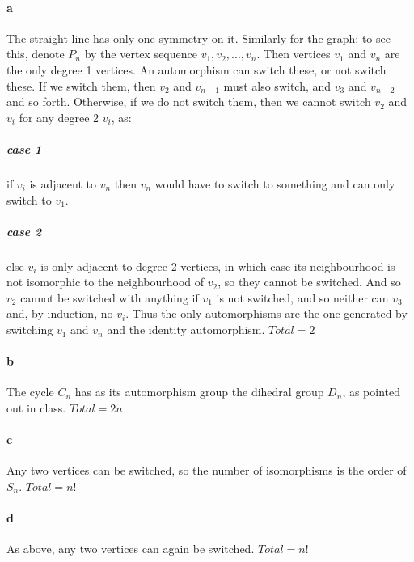 \paragraph{a} The straight line has only one symmetry on it. Similarly for the graph: to see this, denote $P_n$ by the vertex sequence $v_1,v_2,...,v_n$. Then vertices $v_1$ and $v_n$ are the only degree 1 vertices. An automorphism can switch these, or not switch these. If we switch them, then $v_2$ and $v_{n-1}$ must also switch, and $v_3$ and $v_{n-2}$ and so forth. Otherwise, if we do not switch them, then we cannot switch $v_2$ and $v_i$ for any degree 2 $v_i$, as:
\subparagraph{case 1} if $v_i$ is adjacent to $v_n$ then $v_n$ would have to switch to something and can only switch to $v_1$.
\subparagraph{case 2} else $v_i$ is only adjacent to degree 2 vertices, in which case its neighbourhood is not isomorphic to the neighbourhood of $v_2$, so they cannot be switched.
And so $v_2$ cannot be switched with anything if $v_1$ is not switched, and so neither can $v_3$ and, by induction, no $v_i$. Thus the only automorphisms are the one generated by switching $v_1$ and $v_n$ and the identity automorphism. $Total = 2$
\paragraph{b} The cycle $C_n$ has as its automorphism group the dihedral group $D_n$, as pointed out in class. $Total = 2n$
\paragraph{c} Any two vertices can be switched, so the number of isomorphisms is the order of $S_n$. $Total = n!$
\paragraph{d} As above, any two vertices can again be switched. $Total = n!$
